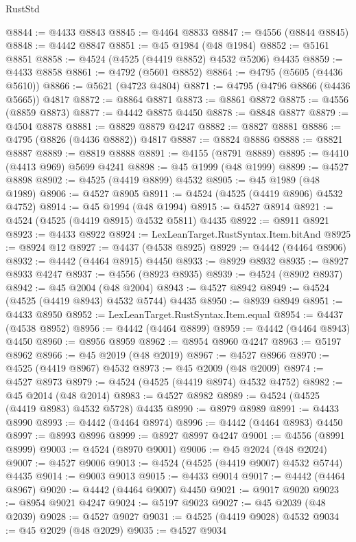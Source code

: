 \begin{lexlean}{RustStd}
\begin{coremodule}
@8844 := @4433 @8843
@8845 := @4464 @8833
@8847 := @4556 (@8844 @8845)
@8848 := @4442 @8847
@8851 := @45 @1984 (@48 @1984)
@8852 := @5161 @8851
@8858 := @4524 (@4525 (@4419 @8852) @4532 @5206) @4435
@8859 := @4433 @8858
@8861 := @4792 (@5601 @8852)
@8864 := @4795 (@5605 (@4436 @5610))
@8866 := @5621 (@4723 @4804)
@8871 := @4795 (@4796 @8866 (@4436 @5665)) @4817
@8872 := @8864 @8871
@8873 := @8861 @8872
@8875 := @4556 (@8859 @8873)
@8877 := @4442 @8875 @4450
@8878 := @8848 @8877
@8879 := @4504 @8878
@8881 := @8829 @8879 @4247
@8882 := @8827 @8881
@8886 := @4795 (@8826 (@4436 @8882)) @4817
@8887 := @8824 @8886
@8888 := @8821 @8887
@8889 := @8819 @8888
@8891 := @4155 (@8791 @8889)
@8895 := @4410 (@4413 @969) @5699 @4241
@8898 := @45 @1999 (@48 @1999)
@8899 := @4527 @8898
@8902 := @4525 (@4419 @8899) @4532
@8905 := @45 @1989 (@48 @1989)
@8906 := @4527 @8905
@8911 := @4524 (@4525 (@4419 @8906) @4532 @4752)
@8914 := @45 @1994 (@48 @1994)
@8915 := @4527 @8914
@8921 := @4524 (@4525 (@4419 @8915) @4532 @5811) @4435
@8922 := @8911 @8921
@8923 := @4433 @8922
@8924 := LexLeanTarget.RustSyntax.Item.bitAnd
@8925 := @8924 @12
@8927 := @4437 (@4538 @8925)
@8929 := @4442 (@4464 @8906)
@8932 := @4442 (@4464 @8915) @4450
@8933 := @8929 @8932
@8935 := @8927 @8933 @4247
@8937 := @4556 (@8923 @8935)
@8939 := @4524 (@8902 @8937)
@8942 := @45 @2004 (@48 @2004)
@8943 := @4527 @8942
@8949 := @4524 (@4525 (@4419 @8943) @4532 @5744) @4435
@8950 := @8939 @8949
@8951 := @4433 @8950
@8952 := LexLeanTarget.RustSyntax.Item.equal
@8954 := @4437 (@4538 @8952)
@8956 := @4442 (@4464 @8899)
@8959 := @4442 (@4464 @8943) @4450
@8960 := @8956 @8959
@8962 := @8954 @8960 @4247
@8963 := @5197 @8962
@8966 := @45 @2019 (@48 @2019)
@8967 := @4527 @8966
@8970 := @4525 (@4419 @8967) @4532
@8973 := @45 @2009 (@48 @2009)
@8974 := @4527 @8973
@8979 := @4524 (@4525 (@4419 @8974) @4532 @4752)
@8982 := @45 @2014 (@48 @2014)
@8983 := @4527 @8982
@8989 := @4524 (@4525 (@4419 @8983) @4532 @5728) @4435
@8990 := @8979 @8989
@8991 := @4433 @8990
@8993 := @4442 (@4464 @8974)
@8996 := @4442 (@4464 @8983) @4450
@8997 := @8993 @8996
@8999 := @8927 @8997 @4247
@9001 := @4556 (@8991 @8999)
@9003 := @4524 (@8970 @9001)
@9006 := @45 @2024 (@48 @2024)
@9007 := @4527 @9006
@9013 := @4524 (@4525 (@4419 @9007) @4532 @5744) @4435
@9014 := @9003 @9013
@9015 := @4433 @9014
@9017 := @4442 (@4464 @8967)
@9020 := @4442 (@4464 @9007) @4450
@9021 := @9017 @9020
@9023 := @8954 @9021 @4247
@9024 := @5197 @9023
@9027 := @45 @2039 (@48 @2039)
@9028 := @4527 @9027
@9031 := @4525 (@4419 @9028) @4532
@9034 := @45 @2029 (@48 @2029)
@9035 := @4527 @9034

\end{coremodule}
\end{lexlean}

